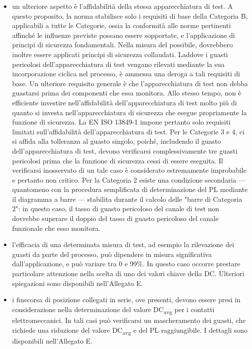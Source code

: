 \begin{itemize}
    \item un ulteriore aspetto è l'affidabilità della stessa apparecchiatura di test. A questo proposito, la norma stabilisce solo i requisiti di base della Categoria B, applicabili a tutte le Categorie, ossia la conformità alle norme pertinenti affinché le influenze previste possano essere sopportate, e l'applicazione di principi di sicurezza fondamentali. Nella misura del possibile, dovrebbero inoltre essere applicati principi di sicurezza collaudati. Laddove i guasti pericolosi dell'apparecchiatura di test vengano rilevati mediante la sua incorporazione ciclica nel processo, è ammessa una deroga a tali requisiti di base. Un ulteriore requisito generale è che l'apparecchiatura di test non debba guastarsi prima dei componenti che essa monitora. Allo stesso tempo, non è efficiente investire nell'affidabilità dell'apparecchiatura di test molto più di quanto si investa nell'apparecchiatura di sicurezza che esegue propriamente la funzione di sicurezza. La EN ISO 13849-1 impone pertanto solo requisiti limitati sull'affidabilità dell'apparecchiatura di test. Per le Categorie 3 e 4, ci si affida alla tolleranza al guasto singolo, poiché, includendo il guasto dell'apparecchiatura di test, devono verificarsi complessivamente tre guasti pericolosi prima che la funzione di sicurezza cessi di essere eseguita. Il verificarsi inosservato di un tale caso è considerato estremamente improbabile e pertanto non critico. Per la Categoria 2 esiste una condizione secondaria — quantomeno con la procedura semplificata di determinazione del PL mediante il diagramma a barre — stabilita durante il calcolo delle "barre di Categoria 2": in questo caso, il tasso di guasto pericoloso del canale di test non dovrebbe superare il doppio del tasso di guasto pericoloso del canale funzionale che esso monitora.
    \item l'efficacia di una determinata misura di test, ad esempio la rilevazione dei guasti da parte del processo, può dipendere in misura significativa dall'applicazione, e può variare tra 0 e 99\%. In questo caso occorre prestare particolare attenzione nella scelta di uno dei valori chiave della DC. Ulteriori spiegazioni sono disponibili nell'Allegato E.
    \item i finecorsa di posizione collegati in serie, ove presenti, devono essere presi in considerazione nella determinazione del valore DC\textsubscript{avg} per i contatti elettromeccanici. In tali casi può verificarsi un mascheramento dei guasti, che richiede una riduzione del valore DC\textsubscript{avg} e del PL raggiungibile. I dettagli sono disponibili nell'Allegato E.

\end{itemize}
